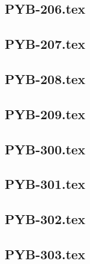 \renewcommand{\xxexo}{PYB-206.tex} 
\subsection*{\xxexo} 
\graphicspath{{../../exos/python_bases/PYB-206/}}
 
 
\renewcommand{\xxexo}{PYB-207.tex} 
\subsection*{\xxexo} 
\graphicspath{{../../exos/python_bases/PYB-207/}}
 
 
\renewcommand{\xxexo}{PYB-208.tex} 
\subsection*{\xxexo} 
\graphicspath{{../../exos/python_bases/PYB-208/}}
 
 
\renewcommand{\xxexo}{PYB-209.tex} 
\subsection*{\xxexo} 
\graphicspath{{../../exos/python_bases/PYB-209/}}
 
 
\renewcommand{\xxexo}{PYB-300.tex} 
\subsection*{\xxexo} 
\graphicspath{{../../exos/python_bases/PYB-300/}}
 
 
\renewcommand{\xxexo}{PYB-301.tex} 
\subsection*{\xxexo} 
\graphicspath{{../../exos/python_bases/PYB-301/}}
 
 
\renewcommand{\xxexo}{PYB-302.tex} 
\subsection*{\xxexo} 
\graphicspath{{../../exos/python_bases/PYB-302/}}
 
 
\renewcommand{\xxexo}{PYB-303.tex} 
\subsection*{\xxexo} 
\graphicspath{{../../exos/python_bases/PYB-303/}}
 
 
